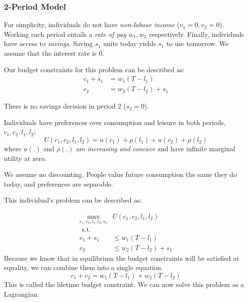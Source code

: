 \documentclass[11pt]{article}
\begin{document}
\newpage

\subsubsection{2-Period Model}

For simplicity, individuals do not have \textit{non-labour income} ($v_1 = 0, v_2=0$). Working each period entails a \textit{rate of pay} $w_1, w_2$ respectively. Finally, individuals have access to \textit{savings}. Saving $s_1$ units today yields $s_1$ to use tomorrow. We assume that the interest rate is 0.

Our budget constraints for this problem can be described as:
\begin{equation}
\begin{aligned}
c_1+s_1 & =w_1\left(T-l_1\right) \\
c_2 & =w_2\left(T-l_2\right)+s_1
\end{aligned}
\end{equation}
\begin{note}
    There is no savings decision in period 2 ($s_2 = 0$).
\end{note}

Individuals have preferences over consumption and leisure in both periods, $c_1, c_2, l_1, l_2$:
\begin{equation}
U\left(c_1, c_2, l_1, l_2\right)=u\left(c_1\right)+\rho\left(l_1\right)+u\left(c_2\right)+\rho\left(l_2\right)
\end{equation}
where $u(.)$ and $\rho(.)$ are \textit{increasing and concave} and have infinite marginal utility at zero.
\begin{note}
    We assume no discounting. People value future consumption the same they do today, and preferences are separable.
\end{note}

This individual's problem can be described as:

\begin{equation}
\begin{array}{rl}
\underset{c_1, c_2, l_1, l_2, s_1}{\max} & U\left(c_1, c_2, l_1, l_2\right) \\
\text { s.t. } & \\
c_1+s_1 & \leq w_1\left(T-l_1\right) \\
c_2 & \leq w_2\left(T-l_2\right)+s_1
\end{array}
\end{equation}
Because we know that in equilibrium the budget constraints will be satisfied at equality, we can combine them into a single equation.
\begin{equation}
    \label{lifetime budget constraint}
    c_1 + c_2 = w_1(T-l_1) + w_2(T-l_2)
\end{equation}
This is called the lifetime budget constraint. We can now solve this problem as a Lagrangian.
\end{document}
